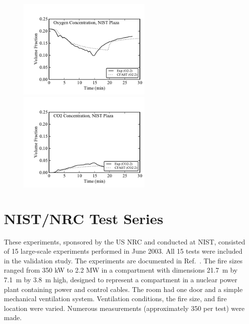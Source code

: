 \begin{figure}[p]
\begin{center}
\includegraphics[width=2.6in]{FIGURES/NIST_PLAZA/Room_2_Oxygen} \\
\includegraphics[width=2.6in]{FIGURES/NIST_PLAZA/Room_2_CO2} 
\end{center}
\end{figure}

\clearpage

\section{NIST/NRC Test Series}

These experiments, sponsored by the US NRC and conducted at NIST, consisted of 15 large-scale experiments performed in June 2003. All 15 tests were included in the validation study. The experiments are documented in Ref.~\cite{Hamins:2005}. The fire sizes ranged from 350 kW to 2.2 MW in a compartment with dimensions 21.7~m by 7.1~m by 3.8~m high, designed to represent a compartment in a nuclear power plant containing power and control cables. The room had one door and a simple mechanical ventilation system. Ventilation conditions, the fire size, and fire location were varied. Numerous measurements (approximately 350 per test) were made. 


